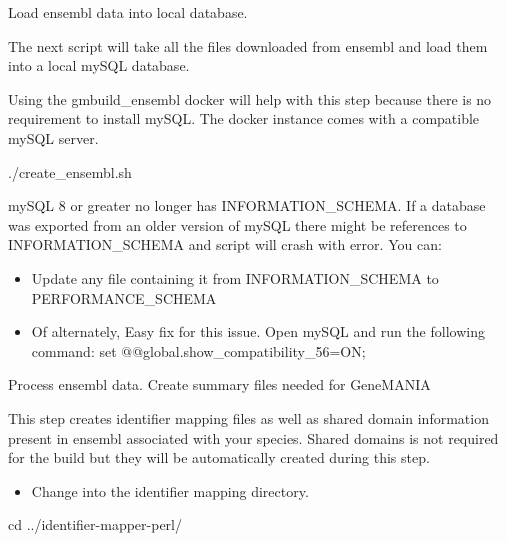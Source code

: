 \documentclass[]{book}
\newenvironment{Shaded}{\begin{snugshade}}{\end{snugshade}}
\newcommand{\BuiltInTok}[1]{#1}
\newcommand{\ExtensionTok}[1]{#1}
\newcommand{\NormalTok}[1]{#1}
\providecommand{\tightlist}{%
  \setlength{\itemsep}{0pt}\setlength{\parskip}{0pt}}
\newenvironment{rmdblock}[1]
  {\begin{shaded*}
  \begin{itemize}
  \renewcommand{\labelitemi}{
    \raisebox{-.7\height}[0pt][0pt]{
      {\setkeys{Gin}{width=3em,keepaspectratio}\texttt{[image: images/\#1]}}
    }
  }
  \item
  }
  {
  \end{itemize}
  \end{shaded*}
  }
\newenvironment{rmd-troubleshooting}
  {\begin{rmdblock}{troubleshooting}}
  {\end{rmdblock}}
\newenvironment{rmd-tip}
  {\begin{rmdblock}{tip}}
  {\end{rmdblock}}
\begin{document}
Load ensembl data into local database.

The next script will take all the files downloaded from ensembl and load
them into a local mySQL database.

\begin{rmd-tip}
Using the gmbuild\_ensembl docker will help with this step because there
is no requirement to install mySQL. The docker instance comes with a
compatible mySQL server.
\end{rmd-tip}

\begin{Shaded}
\begin{Highlighting}[]
\ExtensionTok{./create_ensembl.sh} 
\end{Highlighting}
\end{Shaded}

\begin{rmd-troubleshooting}
mySQL 8 or greater no longer has INFORMATION\_SCHEMA. If a database was
exported from an older version of mySQL there might be references to
INFORMATION\_SCHEMA and script will crash with error. You can:

\begin{itemize}
\item
  Update any file containing it from INFORMATION\_SCHEMA to
  PERFORMANCE\_SCHEMA
\item
  Of alternately, Easy fix for this issue. Open mySQL and run the
  following command: set @@global.show\_compatibility\_56=ON;
\end{itemize}
\end{rmd-troubleshooting}

Process ensembl data. Create summary files needed for GeneMANIA

This step creates identifier mapping files as well as shared domain
information present in ensembl associated with your species. Shared
domains is not required for the build but they will be automatically
created during this step.

\begin{itemize}
\tightlist
\item
  Change into the identifier mapping directory.
\end{itemize}

\begin{Shaded}
\begin{Highlighting}[]
\BuiltInTok{cd}\NormalTok{ ../identifier-mapper-perl/}
\end{Highlighting}
\end{Shaded}
\end{document}
